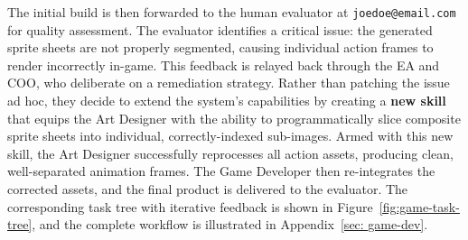 \documentclass[11pt,a4paper]{article}
\begin{document}
The initial build is then forwarded to the human evaluator at \texttt{joedoe@email.com} for quality assessment. The evaluator identifies a critical issue: the generated sprite sheets are not properly segmented, causing individual action frames to render incorrectly in-game. This feedback is relayed back through the EA and COO, who deliberate on a remediation strategy. Rather than patching the issue ad hoc, they decide to extend the system's capabilities by creating a \textbf{new skill} that equips the Art Designer with the ability to programmatically slice composite sprite sheets into individual, correctly-indexed sub-images. Armed with this new skill, the Art Designer successfully reprocesses all action assets, producing clean, well-separated animation frames. The Game Developer then re-integrates the corrected assets, and the final product is delivered to the evaluator. The corresponding task tree with iterative feedback is shown in Figure~\ref{fig:game-task-tree}, and the complete workflow is illustrated in Appendix~\ref{sec: game-dev}.











\end{document}
